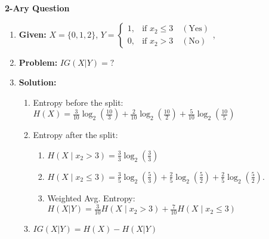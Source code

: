 \begin{example} \textbf{2-Ary Question}
    \begin{enumerate}
        \item \textbf{Given:} $X= \{0,1,2\}$, $Y = 
        \begin{cases} 
        1, & \text{if } x_2 \leq 3 \quad (\text{Yes}) \\
        0, & \text{if } x_2 > 3 \quad (\text{No})
        \end{cases}$, 
        \item \textbf{Problem:} $IG(X|Y) = ?$
        \item \textbf{Solution:}
        \begin{enumerate}
            \item Entropy before the split: $H(X) = \frac{3}{10} \log_2\left(\frac{10}{3}\right) + \frac{2}{10} \log_2\left(\frac{10}{2}\right) + \frac{5}{10} \log_2\left(\frac{10}{5}\right)$
            \item Entropy after the split: 
            \begin{enumerate}
                \item $H(X \mid x_2 > 3) = \frac{3}{3} \log_2 \left(\frac{3}{3}\right)$ 
                \item $H(X \mid x_2 \leq 3) = \frac{3}{5} \log_2 \left(\frac{5}{3}\right) + \frac{2}{5} \log_2 \left(\frac{5}{2}\right)+ \frac{2}{5} \log_2 \left(\frac{5}{2}\right)$.
                \item Weighted Avg. Entropy: $H(X|Y) = \frac{3}{10} H(X \mid x_2 > 3) + \frac{7}{10} H(X \mid x_2 \leq 3)$
            \end{enumerate}
            \item $IG(X|Y) = H(X) - H(X|Y)$
        \end{enumerate}
    \end{enumerate}
\end{example}

